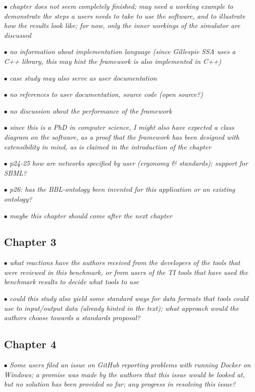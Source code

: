 \documentclass[10pt]{article}
\newcommand{\exam}[2][\  ]{\hspace{0pt}\marginpar{\color{red}#1}$\bullet$ \textit{#2}}
\newcommand{\imp}[1]{{\color{red} #1}}
\newcommand{\bigexclaim}{\raisebox{-0.1em}{\BigTriangleUp}\hspace{-0.32em}\llap{\small\textbf{!}}\hspace{0.32em}}
\newcommand{\tagimp}{\bigexclaim}
\newcommand{\tagtime}{{\Large $\hourglass$}}
\begin{document}
{\exam[\tagimp \tagtime]{chapter does not seem completely finished; \imp{may need a working example to demonstrate the steps
	a users needs to take to use the software, and to illustrate how the results look like}; for now, only
	the inner workings of the simulator are discussed}

\exam{no information about implementation language
	(since Gillespie SSA uses a C++ library, this may hint the framework is also implemented in C++)}

\exam{case
	study may also serve as user documentation}

\exam{no references to user documentation, source code
	(open source?)}

\exam{no discussion about the performance of the framework}

\exam[\tagtime]{since this is a PhD in
	computer science, I might also have expected a class diagram on the software, as a proof that the
	framework has been designed with extensibility in mind, as is claimed in the introduction of the chapter}

\exam{p24-25 how are networks specified by user (ergonomy \& standards); support for SBML?}

\exam{p26: has the BBL-ontology been invented for this application or an existing ontology?}

\exam{maybe this chapter should come after the next chapter}

\subsection{Chapter 3}

\exam{what reactions have the authors received from the developers of the tools that were reviewed in
	this benchmark, or from users of the TI tools that have used the benchmark results to decide what
	tools to use}

\exam{could this study also yield some standard ways for data formats that tools could use to input/output
	data (already hinted in the text); what approach would the authors choose towards a standards
	proposal?}

\subsection{Chapter 4}

\exam{Some users filed an issue on GitHub reporting problems with running Docker on Windows; a
	promise was made by the authors that this issue would be looked at, but no solution has been
	provided so far; any progress in resolving this issue?}

}
\end{document}
